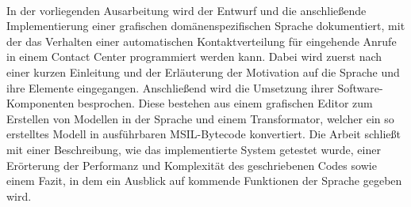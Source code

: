 \kurzfassung

\paragraph*{}
In der vorliegenden Ausarbeitung wird der Entwurf und die anschließende Implementierung einer grafischen domänenspezifischen Sprache dokumentiert, mit der das Verhalten einer automatischen Kontaktverteilung für eingehende Anrufe in einem Contact Center programmiert werden kann. Dabei wird zuerst nach einer kurzen Einleitung und der Erläuterung der Motivation auf die Sprache und ihre Elemente eingegangen. Anschließend wird die Umsetzung ihrer Software-Komponenten besprochen. Diese bestehen aus einem grafischen Editor zum Erstellen von Modellen in der Sprache und einem Transformator, welcher ein so erstelltes Modell in ausführbaren MSIL-Bytecode konvertiert. Die Arbeit schließt mit einer Beschreibung, wie das implementierte System getestet wurde, einer Erörterung der Performanz und Komplexität des geschriebenen Codes sowie einem Fazit, in dem ein Ausblick auf kommende Funktionen der Sprache gegeben wird.